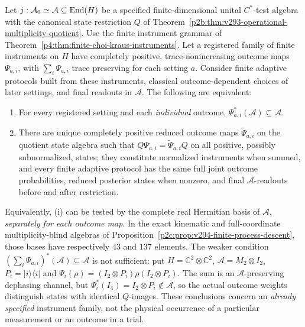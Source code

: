 \documentclass[12pt,a4paper]{article}
\begin{document}
\begin{theorem}
\label{p4:thm:v296-outcome-wise-instrument-descent}
Let $j:\mathcal A_0\simeq\mathcal A\subseteq\operatorname{End}(H)$ be a
specified finite-dimensional unital $C^*$-test algebra with the
canonical state restriction $Q$ of
Theorem~\ref{p2b:thm:v293-operational-multiplicity-quotient}.
Use the finite instrument grammar of
Theorem~\ref{p4:thm:finite-choi-kraus-instruments}. Let a registered
family of finite instruments on $H$ have completely
positive, trace-nonincreasing outcome maps $\Psi_{a,i}$, with
$\sum_i\Psi_{a,i}$ trace preserving for each setting $a$. Consider
finite adaptive protocols built from these instruments, classical
outcome-dependent choices of later settings, and final readouts in
$\mathcal A$. The following are equivalent:
\begin{enumerate}[label=(\roman*),leftmargin=2em]
\item For every registered setting and each \emph{individual} outcome,
$\Psi_{a,i}^*(\mathcal A)\subseteq\mathcal A$.
\item There are unique completely positive reduced outcome maps
$\widetilde\Psi_{a,i}$ on the quotient state algebra such that
$Q\Psi_{a,i}=\widetilde\Psi_{a,i}Q$ on all positive, possibly
subnormalized, states; they constitute normalized instruments when
summed, and every finite adaptive protocol has the same full joint
outcome probabilities, reduced posterior states when nonzero, and
final $\mathcal A$-readouts before and after restriction.
\end{enumerate}
Equivalently, (i) can be tested by the complete real Hermitian basis
of $\mathcal A$, \emph{separately for each outcome map}. In the exact
kinematic and full-coordinate multiplicity-blind algebras of
Proposition~\ref{p2c:prop:v294-finite-process-descent}, those bases
have respectively $43$ and $137$ elements.
The weaker condition
$(\sum_i\Psi_{a,i})^*(\mathcal A)\subseteq\mathcal A$ is not
sufficient: put $H=\mathbb C^2\otimes\mathbb C^2$,
$\mathcal A=M_2\otimes I_2$, $P_i=|i\rangle\langle i|$ and
$\Psi_i(\rho)=(I_2\otimes P_i)\rho(I_2\otimes P_i)$.
The sum is an $\mathcal A$-preserving dephasing channel, but
$\Psi_i^*(I_4)=I_2\otimes P_i\notin\mathcal A$, so the actual outcome
weights distinguish states with identical $Q$-images.
These conclusions concern an \emph{already specified} instrument
family, not the physical occurrence of a particular measurement or an
outcome in a trial.
\end{theorem}
\end{document}
